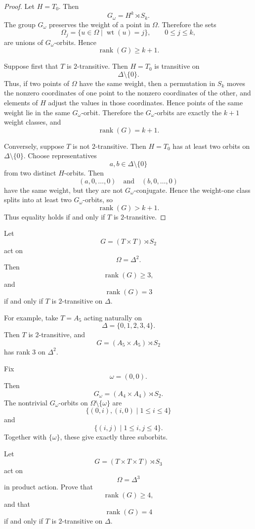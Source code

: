 \begin{proof}
Let \(H=T_0\). Then
\[
G_\omega=H^k\rtimes S_k.
\]
The group \(G_\omega\) preserves the weight of a point in \(\Omega\). Therefore the
sets
\[
\Omega_j=\{u\in \Omega\mid \operatorname{wt}(u)=j\},
\qquad 0\leq j\leq k,
\]
are unions of \(G_\omega\)-orbits. Hence
\[
\operatorname{rank}(G)\geq k+1.
\]

Suppose first that \(T\) is \(2\)-transitive. Then \(H=T_0\) is transitive on
\[
\Delta\setminus\{0\}.
\]
Thus, if two points of \(\Omega\) have the same weight, then a permutation in
\(S_k\) moves the nonzero coordinates of one point to the nonzero coordinates of
the other, and elements of \(H\) adjust the values in those coordinates. Hence points
of the same weight lie in the same \(G_\omega\)-orbit. Therefore the \(G_\omega\)-orbits
are exactly the \(k+1\) weight classes, and
\[
\operatorname{rank}(G)=k+1.
\]

Conversely, suppose \(T\) is not \(2\)-transitive. Then \(H=T_0\) has at least two
orbits on \(\Delta\setminus\{0\}\). Choose representatives
\[
a,b\in \Delta\setminus\{0\}
\]
from two distinct \(H\)-orbits. Then
\[
(a,0,\ldots,0)
\quad\text{and}\quad
(b,0,\ldots,0)
\]
have the same weight, but they are not \(G_\omega\)-conjugate. Hence the weight-one
class splits into at least two \(G_\omega\)-orbits, so
\[
\operatorname{rank}(G)>k+1.
\]
Thus equality holds if and only if \(T\) is \(2\)-transitive.
\end{proof}

\begin{example}[The case \(k=2\)]
Let
\[
G=(T\times T)\rtimes S_2
\]
act on
\[
\Omega=\Delta^2.
\]
Then
\[
\operatorname{rank}(G)\geq 3,
\]
and
\[
\operatorname{rank}(G)=3
\]
if and only if \(T\) is \(2\)-transitive on \(\Delta\).

For example, take \(T=A_5\) acting naturally on
\[
\Delta=\{0,1,2,3,4\}.
\]
Then \(T\) is \(2\)-transitive, and
\[
G=(A_5\times A_5)\rtimes S_2
\]
has rank \(3\) on \(\Delta^2\).

Fix
\[
\omega=(0,0).
\]
Then
\[
G_\omega=(A_4\times A_4)\rtimes S_2.
\]
The nontrivial \(G_\omega\)-orbits on \(\Omega\setminus\{\omega\}\) are
\[
\{(0,i),(i,0)\mid 1\leq i\leq 4\}
\]
and
\[
\{(i,j)\mid 1\leq i,j\leq 4\}.
\]
Together with \(\{\omega\}\), these give exactly three suborbits.
\end{example}

\begin{exercise}
Let
\[
G=(T\times T\times T)\rtimes S_3
\]
act on
\[
\Omega=\Delta^3
\]
in product action. Prove that
\[
\operatorname{rank}(G)\geq 4,
\]
and that
\[
\operatorname{rank}(G)=4
\]
if and only if \(T\) is \(2\)-transitive on \(\Delta\).
\end{exercise}

